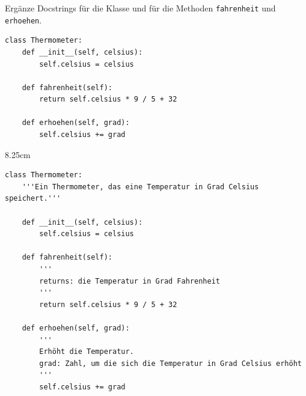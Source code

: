 \question[4]
Ergänze Docstrings für die Klasse und für die Methoden \texttt{fahrenheit} und \texttt{erhoehen}.
\begin{lstlisting}
class Thermometer:
    def __init__(self, celsius):
        self.celsius = celsius

    def fahrenheit(self):
        return self.celsius * 9 / 5 + 32

    def erhoehen(self, grad):
        self.celsius += grad
\end{lstlisting}
\begin{solutionbox}{8.25cm}
\begin{lstlisting}
class Thermometer:
    '''Ein Thermometer, das eine Temperatur in Grad Celsius speichert.'''

    def __init__(self, celsius):
        self.celsius = celsius

    def fahrenheit(self):
        '''
        returns: die Temperatur in Grad Fahrenheit
        '''
        return self.celsius * 9 / 5 + 32

    def erhoehen(self, grad):
        '''
        Erhöht die Temperatur.
        grad: Zahl, um die sich die Temperatur in Grad Celsius erhöht
        '''
        self.celsius += grad
\end{lstlisting}
\end{solutionbox}

